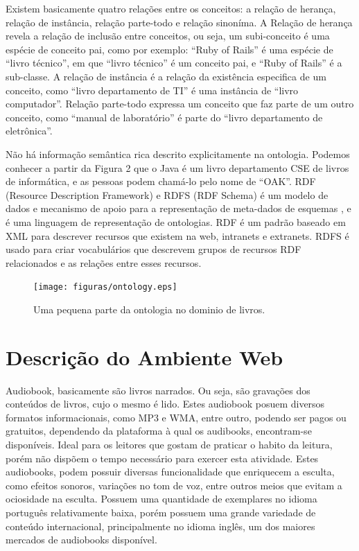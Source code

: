 Existem basicamente quatro relações entre os conceitos: a relação de herança, relação de instância, relação parte-todo e relação sinoníma. A Relação de herança revela a relação de inclusão entre conceitos, ou seja, um subi-conceito é uma espécie de conceito pai, como por exemplo: ``Ruby of Rails'' é uma espécie de ``livro técnico'', em que ``livro técnico'' é um conceito pai, e ``Ruby of Rails'' é a sub-classe. A relação de instância é a relação da existência especifica de um conceito, como ``livro departamento de TI'' é uma instância de ``livro computador''. Relação parte-todo expressa um conceito que faz parte de um outro conceito, como ``manual de laboratório'' é parte do ``livro departamento de eletrônica''.

Não há informação semântica rica descrito explicitamente na ontologia. Podemos conhecer a partir da Figura 2 que o Java é um livro departamento CSE de livros de informática, e as pessoas podem chamá-lo pelo nome de ``OAK''. RDF (Resource Description Framework) e RDFS (RDF Schema) é um modelo de dados e mecanismo de apoio para a representação de meta-dados de esquemas \cite{rdf}, e é uma linguagem de representação de ontologias. RDF é um padrão baseado em XML para descrever recursos que existem na web, intranets e extranets. RDFS é usado para criar vocabulários que descrevem grupos de recursos RDF relacionados e as relações entre esses recursos. 


 \begin{figure}[ht]
	\centering
		\texttt{[image: figuras/ontology.eps]}
	\caption{Uma pequena parte da ontologia no dominio de livros.}
	\label{lanctocalivros}
\end{figure}

\section{Descrição do Ambiente Web}
Audiobook, basicamente são livros narrados. Ou seja, são gravações dos conteúdos de livros, cujo o mesmo é lido. Estes audiobook posuem diversos formatos informacionais, como MP3 e WMA, entre outro, podendo ser pagos ou gratuitos, dependendo da plataforma à qual os audibooks, encontram-se disponíveis.
Ideal para os leitores que gostam de praticar o habito da leitura, porém não dispõem o tempo necessário para exercer esta atividade. Estes audiobooks, podem possuir diversas funcionalidade que enriquecem a esculta, como efeitos sonoros, variações no tom de voz, entre outros meios que evitam a ociosidade na esculta.
Possuem uma quantidade de exemplares no idioma português relativamente baixa, porém possuem uma grande variedade de conteúdo internacional, principalmente no idioma inglês, um dos maiores mercados de audiobooks disponível.

